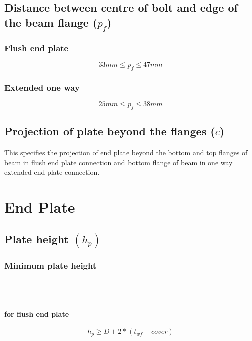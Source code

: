 \documentclass[11.5pt,a4paper,oneside]{report}
\begin{document}
\begin{Form}
\section{Distance between centre of bolt and edge of the beam flange ($p_{f}$)}
	
		\subsection{Flush end plate}
		\qquad {}
			\begin{equation}
				33 mm \leq p_{f} \leq 47 mm
			\end{equation}
			
		\subsection{Extended one way}
		\qquad {}
			\begin{equation}
				25 mm \leq p_{f} \leq 38 mm
			\end{equation}

\section{Projection of plate beyond the flanges ($c$)}
\label{cover}
This specifies the projection of end plate beyond the bottom and top flanges of beam in flush end plate connection and bottom flange of beam in one way extended end plate connection.


\chapter{End Plate} 
\section{Plate height \boldmath $(h_{p})$}
	\subsection{Minimum plate height}
	\qquad {} \\ \\
	\subsubsection{for flush end plate}
		\begin{equation}
			h_p \ge D + 2 * (t_{wf} + cover)
		\end{equation}
	

\end{Form}
\end{document}
